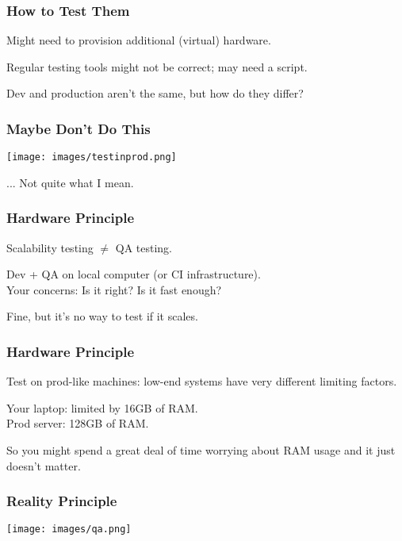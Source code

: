 \begin{frame}
\frametitle{How to Test Them}
Might need to provision additional (virtual) hardware.

Regular testing tools might not be correct; may need a script.

Dev and production aren't the same, but how do they differ?

\end{frame}

\begin{frame}
\frametitle{Maybe Don't Do This}

\begin{center}
	\texttt{[image: images/testinprod.png]}
\end{center}

... Not quite what I mean.

\end{frame}

\begin{frame}
\frametitle{Hardware Principle}



Scalability testing $\neq$  QA testing.

Dev + QA on local computer (or CI infrastructure).\\
\quad Your concerns: Is it right? Is it fast enough?

Fine, but it's no way to test if it scales. 


\end{frame}



\begin{frame}
\frametitle{Hardware Principle}



Test on prod-like machines: low-end systems have very different limiting factors.

Your laptop: limited by 16GB of RAM.\\
Prod server: 128GB of RAM.


So you might spend a great deal of time worrying about RAM usage and it just doesn't matter.


\end{frame}



\begin{frame}
\frametitle{Reality Principle}

\begin{center}
	\texttt{[image: images/qa.png]}
\end{center}


\end{frame}


